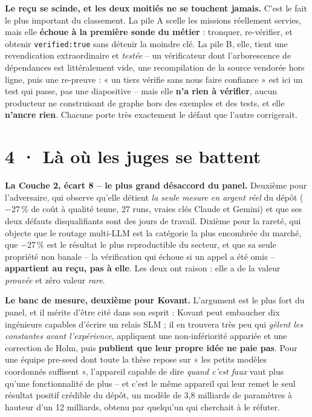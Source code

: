 \documentclass[10pt]{article}
\newcommand{\code}[1]{\texttt{\small #1}}
\begin{document}
\textbf{Le reçu se scinde, et les deux moitiés ne se touchent jamais.} C'est le fait le plus important du
classement. La pile A scelle les missions réellement servies, mais elle \textbf{échoue à la première
sonde du métier} : tronquer, re-vérifier, et obtenir \code{verified:true} sans détenir la moindre clé.
La pile B, elle, tient une revendication extraordinaire et \emph{testée} -- un vérificateur dont
l'arborescence de dépendances est littéralement vide, une recompilation de la source vendorée hors
ligne, puis une re-preuve : « un tiers vérifie sans nous faire confiance » est ici un test qui passe, pas
une diapositive -- mais elle \textbf{n'a rien à vérifier}, aucun producteur ne construisant de graphe
hors des exemples et des tests, et elle \textbf{n'ancre rien}. Chacune porte très exactement le défaut
que l'autre corrigerait.

\section{4 · Là où les juges se battent}

\textbf{La Couche 2, écart 8 -- le plus grand désaccord du panel.} Deuxième pour l'adversaire, qui
observe qu'elle détient \emph{la seule mesure en argent réel} du dépôt ($-$27\,\% de coût à qualité
tenue, 27 runs, vraies clés Claude et Gemini) et que ses deux défauts disqualifiants sont des jours de
travail. Dixième pour la rareté, qui objecte que le routage multi-LLM est la catégorie la plus encombrée
du marché, que $-$27\,\% est le résultat le plus reproductible du secteur, et que sa seule propriété non
banale -- la vérification qui échoue si un appel a été omis -- \textbf{appartient au reçu, pas à elle}.
Les deux ont raison : elle a de la valeur \emph{prouvée} et zéro valeur \emph{rare}.

\textbf{Le banc de mesure, deuxième pour Kovant.} L'argument est le plus fort du panel, et il mérite
d'être cité dans son esprit : Kovant peut embaucher dix ingénieurs capables d'écrire un relais SLM ; il
en trouvera très peu qui \emph{gèlent les constantes avant l'expérience}, appliquent une non-infériorité
appariée et une correction de Holm, puis \textbf{publient que leur propre idée ne paie pas}. Pour une
équipe pre-seed dont toute la thèse repose sur « les petits modèles coordonnés suffisent », l'appareil
capable de dire \emph{quand c'est faux} vaut plus qu'une fonctionnalité de plus -- et c'est le même
appareil qui leur remet le seul résultat positif crédible du dépôt, un modèle de 3,8 milliards de
paramètres à hauteur d'un 12 milliards, obtenu par quelqu'un qui cherchait à le réfuter.
\end{document}

